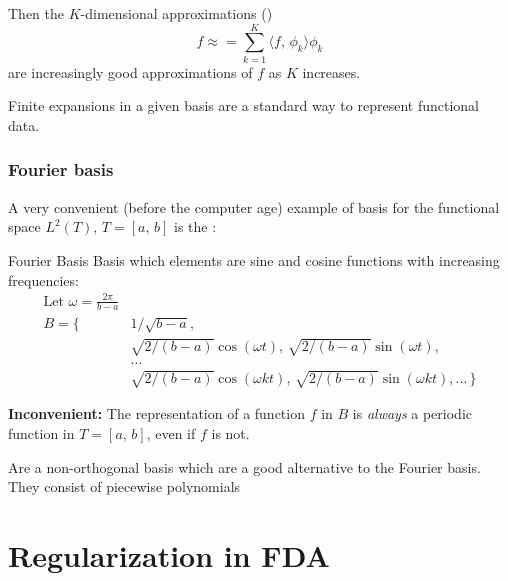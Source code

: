 Then the $K$-dimensional approximations ()
\begin{equation*}
    f \approx = \sum_{k=1}^{K} \langle f,\, \phi_k\rangle \phi_k
\end{equation*}
are increasingly good approximations of $f$ as $K$ increases.

\begin{marker}
    Finite expansions in a given basis are a standard way to represent functional
    data.
\end{marker}

\subsubsection{Fourier basis}

A very convenient (before the computer age) example of
basis for the functional space $L^2(T),\,T=[a,\,b]$ is the :

\begin{definition}{Fourier Basis}{}
    Basis which elements are sine and cosine functions with
    increasing frequencies:
    \begin{align*}
        \text{Let } \omega = \frac{2\pi}{b-a}& \\
        B = \{&
            1/\sqrt{b-a},\\
              &\sqrt{2/(b-a)}\cos(\omega t),\,
            \sqrt{2/(b-a)}\sin(\omega t),\\
              &\ldots \\
              &\sqrt{2/(b-a)}\cos(\omega k t),\,
            \sqrt{2/(b-a)}\sin(\omega k t),\ldots\,
        \}
    \end{align*}
    \begin{note}
        \textbf{Inconvenient:} The representation of a function $f$ in $B$ is
        \emph{always} a periodic function in $T = [a,\,b]$, even if $f$ is not.
    \end{note}
    \begin{note}
         Are a non-orthogonal basis which are a
        good alternative to the Fourier basis. They consist of
        piecewise polynomials 
    \end{note}
\end{definition}

\section{Regularization in FDA}

